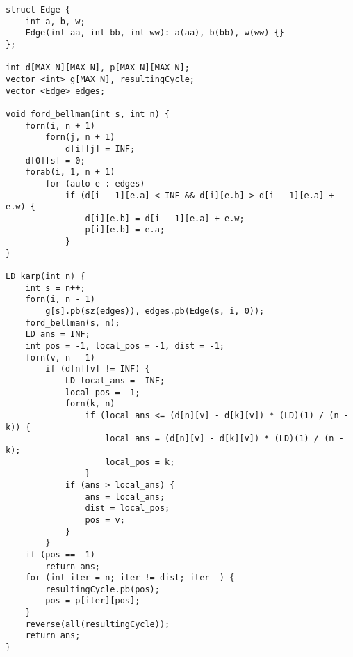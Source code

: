\begin{verbatim}
struct Edge {
	int a, b, w;
	Edge(int aa, int bb, int ww): a(aa), b(bb), w(ww) {}
};

int d[MAX_N][MAX_N], p[MAX_N][MAX_N];
vector <int> g[MAX_N], resultingCycle;
vector <Edge> edges;

void ford_bellman(int s, int n) {
	forn(i, n + 1)
		forn(j, n + 1)
			d[i][j] = INF;
	d[0][s] = 0;
	forab(i, 1, n + 1) 
		for (auto e : edges) 
			if (d[i - 1][e.a] < INF && d[i][e.b] > d[i - 1][e.a] + e.w) {
				d[i][e.b] = d[i - 1][e.a] + e.w;
				p[i][e.b] = e.a; 
			}
}

LD karp(int n) {
	int s = n++;
	forn(i, n - 1)
		g[s].pb(sz(edges)), edges.pb(Edge(s, i, 0));
	ford_bellman(s, n);
	LD ans = INF;
	int pos = -1, local_pos = -1, dist = -1;
	forn(v, n - 1) 
		if (d[n][v] != INF) {
			LD local_ans = -INF;
			local_pos = -1;
			forn(k, n)
				if (local_ans <= (d[n][v] - d[k][v]) * (LD)(1) / (n - k)) {
					local_ans = (d[n][v] - d[k][v]) * (LD)(1) / (n - k);
					local_pos = k;
				}
			if (ans > local_ans) {
				ans = local_ans;
				dist = local_pos;
				pos = v;
			}
		}
	if (pos == -1)
		return ans;
	for (int iter = n; iter != dist; iter--) {
		resultingCycle.pb(pos);
		pos = p[iter][pos];
	}		
	reverse(all(resultingCycle));
	return ans;
}
\end{verbatim}
